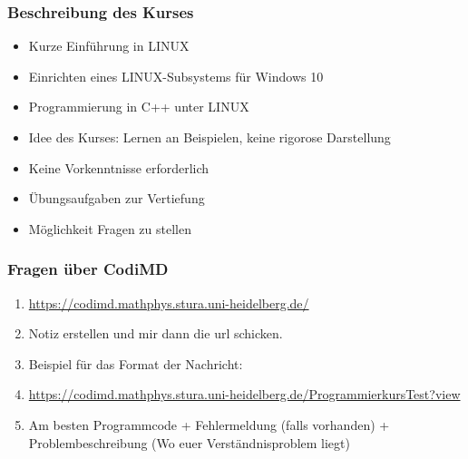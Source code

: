 \nocite{*}
{
  \begin{frame}
    \titlepage
  \end{frame}
}
{
\maketitle
}






\begin{frame}[fragile]
\frametitle{Beschreibung des Kurses}
\begin{itemize}
\item Kurze Einführung in LINUX
\item Einrichten eines LINUX-Subsystems für Windows 10
\item Programmierung in C++ unter LINUX
\item Idee des Kurses: \glqq{}Lernen an Beispielen\grqq{}, keine
  rigorose Darstellung
\item Keine Vorkenntnisse erforderlich
\item Übungsaufgaben zur Vertiefung
\item Möglichkeit Fragen zu stellen
\end{itemize}
\end{frame}

\begin{frame}[fragile]
\frametitle{Fragen über CodiMD}
\begin{enumerate}
\small
\item \url{https://codimd.mathphys.stura.uni-heidelberg.de/}
\item Notiz erstellen und mir dann die url schicken.
\item Beispiel für das Format der Nachricht:
\item \url{https://codimd.mathphys.stura.uni-heidelberg.de/ProgrammierkursTest?view}
\item Am besten Programmcode + Fehlermeldung (falls vorhanden) + Problembeschreibung (Wo euer Verständnisproblem liegt)

\end{enumerate}
\end{frame}

